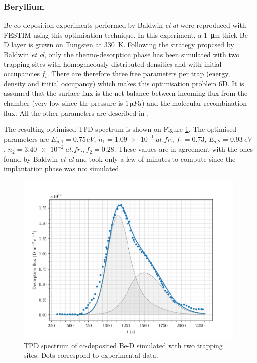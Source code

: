 \subsubsection{Beryllium}
Be co-deposition experiments performed by Baldwin \textit{et al}  were reproduced with FESTIM using this optimisation technique.
In this experiment, a \SI{1}{\micro m} thick Be-D layer is grown on Tungsten at \SI{330}{K}. 
Following the strategy proposed by Baldwin \textit{et al}, only the thermo-desorption phase has been simulated with two trapping sites with homogeneously distributed densities and with initial occupancies $f_i$.
There are therefore three free parameters per trap (energy, density and initial occupancy) which makes this optimisation problem 6D.
It is assumed that the surface flux is the net balance between incoming flux from the chamber (very low since the pressure is $\SI{1}{\micro Pa}$) and the molecular recombination flux.
All the other parameters are described in .

The resulting optimised TPD spectrum is shown on Figure \ref{fig:tpd baldwin}.
The optimised parameters are $E_{p, 1} = \SI{0.75}{eV}$, $n_1 = \SI{1.09e-1}{at.fr.}$, $f_1=0.73$, $E_{p, 2} = \SI{0.93}{eV}$, \newline ${n_2 = \SI{3.40e-2}{at.fr.}}$, $f_2=0.28$.
These values are in agreement with the ones found by Baldwin \textit{et al}  and took only a few of minutes to compute since the implantation phase was not simulated.

\begin{figure}
    \centering
    \includegraphics[width=\linewidth]{Figures/Chapter3/Parametric_optimisation/baldwin_be.pdf}
    \caption{TPD spectrum of co-deposited Be-D \cite{baldwin_experimental_2014} simulated with two trapping sites. Dots correspond to experimental data.}
    \label{fig:tpd baldwin}
\end{figure}

